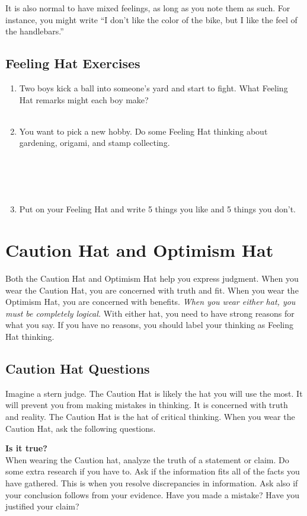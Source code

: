 It is also normal to have mixed feelings, as long as you note them as such. For instance, you might write ``I don't like the color of the bike, but I like the feel of the handlebars.''

\subsection*{Feeling Hat Exercises}
\begin{enumerate}
	\item Two boys kick a ball into someone's yard and start to fight. What Feeling Hat remarks might each boy make? \\~\\
	\item You want to pick a new hobby. Do some Feeling Hat thinking about gardening, origami, and stamp collecting. \\~\\~\\~\\~\\
	\item Put on your Feeling Hat and write 5 things you like and 5 things you don't.
\end{enumerate}

\newpage

\section*{Caution Hat and Optimism Hat}

Both the Caution Hat and Optimism Hat help you express judgment. When you wear the Caution Hat, you are concerned with truth and fit. When you wear the Optimism Hat, you are concerned with benefits. \textit{When you wear either hat, you must be completely logical.} With either hat, you need to have strong reasons for what you say. If you have no reasons, you should label your thinking as Feeling Hat thinking.

\subsection*{Caution Hat Questions}
Imagine a stern judge. The Caution Hat is likely the hat you will use the most. It will prevent you from making mistakes in thinking. It is concerned with truth and reality. The Caution Hat is the hat of critical thinking. When you wear the Caution Hat, ask the following questions.

\textbf{Is it true?} \\
When wearing the Caution hat, analyze the truth of a statement or claim. Do some extra research if you have to. Ask if the information fits all of the facts you have gathered. This is when you resolve discrepancies in information. Ask also if your conclusion follows from your evidence. Have you made a mistake? Have you justified your claim?

